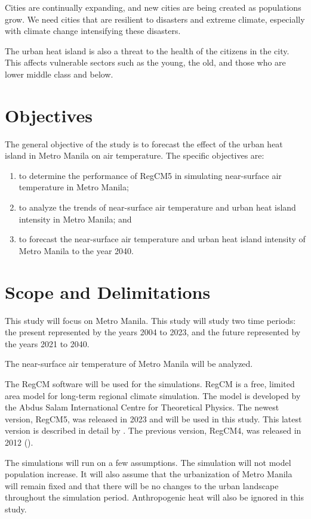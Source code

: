 	Cities are continually expanding, and new cities are being created as populations grow.
	We need cities that are resilient to disasters and extreme climate,
		especially with climate change intensifying these disasters.
	
	The urban heat island is also a threat to the health of the citizens in the city.
	This affects vulnerable sectors such as the young, the old, and those who are lower middle class and below.

\section{Objectives}
	The general objective of the study is to forecast the effect of the urban heat island in Metro Manila on air temperature.
	The specific objectives are:
	\begin{enumerate}
		\item to determine the performance of RegCM5 in simulating near-surface air temperature in Metro Manila;
		\item to analyze the trends of near-surface air temperature and urban heat island intensity in Metro Manila; and
		\item to forecast the near-surface air temperature and urban heat island intensity of Metro Manila to the year 2040.
		
	\end{enumerate}
	

\section{Scope and Delimitations}
	This study will focus on Metro Manila.
	This study will study two time periods: 
		the present represented by the years 2004 to 2023, 
		and the future represented by the years 2021 to 2040.
	
	The near-surface air temperature of Metro Manila will be analyzed.
	
	The RegCM software will be used for the simulations.
	RegCM is a free, limited area model for long-term regional climate simulation.
	The model is developed by the Abdus Salam International Centre for Theoretical Physics.
	The newest version, RegCM5, was released in 2023 and will be used in this study.
	This latest version is described in detail by \textcite{Giorgi2023}. 
	The previous version, RegCM4, was released in 2012 (\textcite{Giorgi2012}).
	
	The simulations will run on a few assumptions.
	The simulation will not model population increase.
	It will also assume that the urbanization of Metro Manila will remain fixed and that there will be no changes to the urban landscape throughout the simulation period.
	Anthropogenic heat will also be ignored in this study.